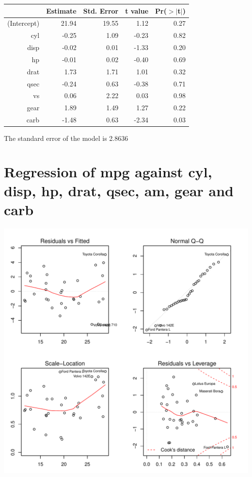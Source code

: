 \documentclass{article}\usepackage[]{graphicx}\usepackage[]{color}
\makeatletter
\def\maxwidth{ %
  \ifdim\Gin@nat@width>\linewidth
    \linewidth
  \else
    \Gin@nat@width
  \fi
}
\newenvironment{knitrout}{}{} %
\makeatother
\begin{document}
\begin{table}[ht]
\centering
\begin{tabular}{rrrrr}
  \hline
 & Estimate & Std. Error & t value & Pr($>$$|$t$|$) \\ 
  \hline
(Intercept) & 21.94 & 19.55 & 1.12 & 0.27 \\ 
  cyl & -0.25 & 1.09 & -0.23 & 0.82 \\ 
  disp & -0.02 & 0.01 & -1.33 & 0.20 \\ 
  hp & -0.01 & 0.02 & -0.40 & 0.69 \\ 
  drat & 1.73 & 1.71 & 1.01 & 0.32 \\ 
  qsec & -0.24 & 0.63 & -0.38 & 0.71 \\ 
  vs & 0.06 & 2.22 & 0.03 & 0.98 \\ 
  gear & 1.89 & 1.49 & 1.27 & 0.22 \\ 
  carb & -1.48 & 0.63 & -2.34 & 0.03 \\ 
   \hline
\end{tabular}
\end{table}




The standard error of the model is 2.8636

\newpage

\section{Regression of mpg against cyl, disp, hp, drat, qsec, am, gear and carb }
\begin{knitrout}
\color{fgcolor}

{\centering \includegraphics[width=\maxwidth]{figure/lm-cyl-disp-hp-drat-qsec-am-gear-carb} 

}



\end{knitrout}
\end{document}
